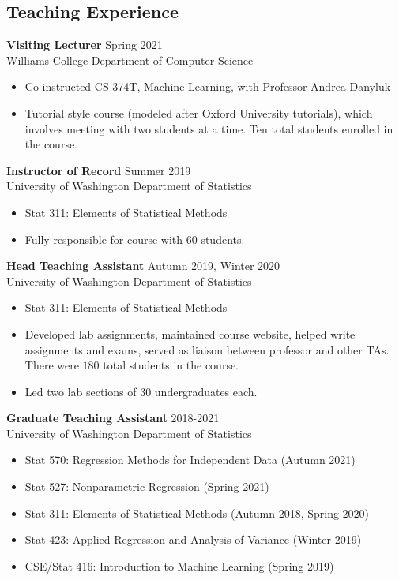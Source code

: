 \documentclass[margin, 10pt]{res}
\begin{document}
\begin{resume}
\section{Teaching Experience}
{\textbf{Visiting Lecturer}} \hfill Spring 2021 \\
Williams College Department of Computer Science
\begin{itemize}
\item Co-instructed CS 374T, Machine Learning, with Professor Andrea Danyluk
\item Tutorial style course (modeled after Oxford University tutorials), which involves meeting with two students at a time. Ten total students enrolled in the course. 
\end{itemize}
{\textbf{Instructor of Record}} \hfill Summer 2019 \\
University of Washington Department of Statistics
\begin{itemize}
\item Stat 311: Elements of Statistical Methods
\item Fully responsible for course with $60$ students.
\end{itemize}
{\textbf{Head Teaching Assistant}} \hfill Autumn 2019, Winter 2020 \\
University of Washington Department of Statistics
\begin{itemize}
\item Stat 311: Elements of Statistical Methods
\item Developed lab assignments, maintained course website, helped write assignments and exams, served as liaison between professor and other TAs. There were $180$ total students in the course. 
\item Led two lab sections of 30 undergraduates each. 
\end{itemize} 
{\textbf{Graduate Teaching Assistant}} \hfill 2018-2021 \\
University of Washington Department of Statistics
\begin{itemize}
\item Stat 570: Regression Methods for Independent Data (Autumn 2021)
\item Stat 527: Nonparametric Regression (Spring 2021)
\item Stat 311: Elements of Statistical Methods (Autumn 2018, Spring 2020)
\item Stat 423:  Applied Regression and Analysis of Variance (Winter 2019)
\item CSE/Stat 416: Introduction to Machine Learning (Spring 2019) 

\end{itemize}
\end{resume}
\end{document}
